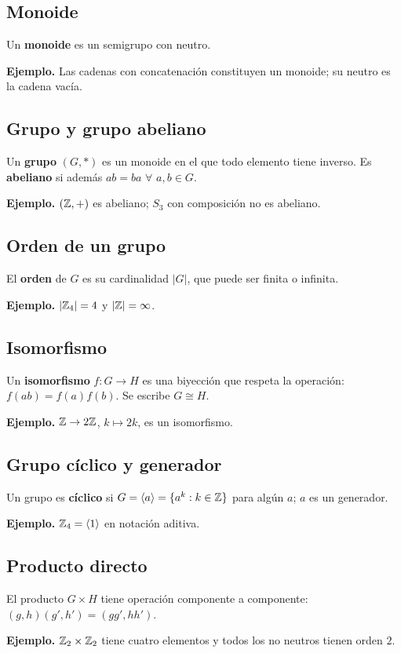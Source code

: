 \documentclass[11pt,a4paper]{article}
\begin{document}
\subsection{Monoide}
\begin{definicion}
Un \textbf{monoide} es un semigrupo con neutro.
\end{definicion}
\textbf{Ejemplo.} Las cadenas con concatenación constituyen un monoide; su neutro es la cadena vacía.


\subsection{Grupo y grupo abeliano}
\begin{definicion}
Un \textbf{grupo} $(G,*)$ es un monoide en el que todo elemento tiene inverso. Es \textbf{abeliano} si además $ab=ba$ $\forall$ $a,b\in G$.
\end{definicion}
\textbf{Ejemplo.} $(\mathbb{Z},+)$ es abeliano; $S_3$ con composición no es abeliano.


\subsection{Orden de un grupo}
\begin{definicion}
El \textbf{orden} de $G$ es su cardinalidad $|G|$, que puede ser finita o infinita.
\end{definicion}
\textbf{Ejemplo.} $|\mathbb{Z}_4|=4$ y $|\mathbb{Z}|=\infty$.


\subsection{Isomorfismo}
\begin{definicion}
Un \textbf{isomorfismo} $f:G\to H$ es una biyección que respeta la operación: $f(ab)=f(a)f(b)$. Se escribe $G\cong H$.
\end{definicion}
\textbf{Ejemplo.} $\mathbb{Z}\to 2\mathbb{Z}$, $k\mapsto 2k$, es un isomorfismo.


\subsection{Grupo cíclico y generador}
\begin{definicion}
Un grupo es \textbf{cíclico} si $G=\langle a\rangle=\{a^k:k\in\mathbb{Z}\}$ para algún $a$; $a$ es un generador.
\end{definicion}
\textbf{Ejemplo.} $\mathbb{Z}_4=\langle 1\rangle$ en notación aditiva.


\subsection{Producto directo}
\begin{definicion}
El producto $G\times H$ tiene operación componente a componente: $(g,h)(g\prime,h\prime)=(gg\prime,hh\prime)$.
\end{definicion}
\textbf{Ejemplo.} $\mathbb{Z}_2\times\mathbb{Z}_2$ tiene cuatro elementos y todos los no neutros tienen orden $2$.
\end{document}
